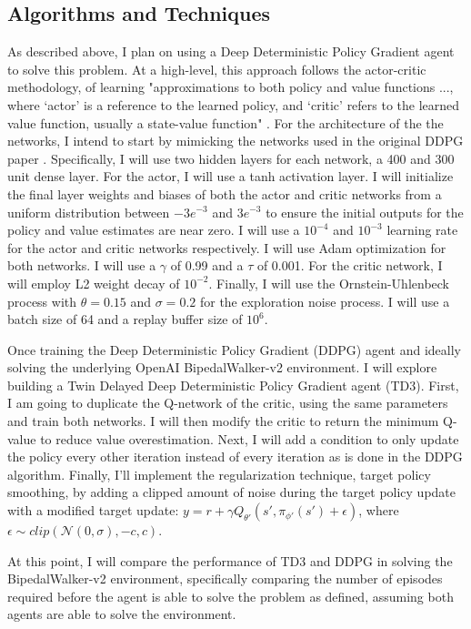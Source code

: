 \documentclass{article}
\begin{document}
\subsection{Algorithms and Techniques}
As described above, I plan on using a Deep Deterministic Policy Gradient agent to solve this problem. At a high-level, this approach follows the actor-critic methodology, of learning "approximations to both policy and value functions ..., where ‘actor’ is a reference to the learned policy, and ‘critic’ refers to the learned value function, usually a state-value function" \cite{Sutton:2018:RLI:3312046}. For the architecture of the the networks, I intend to start by mimicking the networks used in the original DDPG paper \cite{DBLP:journals/corr/LillicrapHPHETS15}. Specifically, I will use two hidden layers for each network, a 400 and 300 unit dense layer. For the actor, I will use a tanh activation layer. I will initialize the final layer weights and biases of both the actor and critic networks from a uniform distribution between $-3e^{-3}$ and $3e^{-3}$ to ensure the initial outputs for the policy and value estimates are near zero. I will use a $10^{-4}$ and $10^{-3}$ learning rate for the actor and critic networks respectively. I will use Adam optimization for both networks. I will use a $\gamma$ of 0.99 and a $\tau$ of 0.001. For the critic network, I will employ L2 weight decay of $10^{-2}$. Finally, I will use the Ornstein-Uhlenbeck process with $\theta = 0.15$ and $\sigma = 0.2$ for the exploration noise process. I will use a batch size of 64 and a replay buffer size of $10^{6}$. 

Once training the Deep Deterministic Policy Gradient (DDPG) agent and ideally solving the underlying OpenAI BipedalWalker-v2 environment. I will explore building a Twin Delayed Deep Deterministic Policy Gradient agent (TD3). First, I am going to duplicate the Q-network of the critic, using the same parameters and train both networks. I will then modify the critic to return the minimum Q-value to reduce value overestimation. Next, I will add a condition to only update the policy every other iteration instead of every iteration as is done in the DDPG algorithm. Finally, I'll implement the regularization technique, target policy smoothing, by adding a clipped amount of noise during the target policy update with a modified target update: $y=r+\gamma Q_{\theta'} (s', \pi_{\phi'}(s')+ \epsilon)$, where $\epsilon \sim clip(\mathcal{N}(0, \sigma), -c, c)$.

At this point, I will compare the performance of TD3 and DDPG in solving the BipedalWalker-v2 environment, specifically comparing the number of episodes required before the agent is able to solve the problem as defined, assuming both agents are able to solve the environment.
\end{document}
